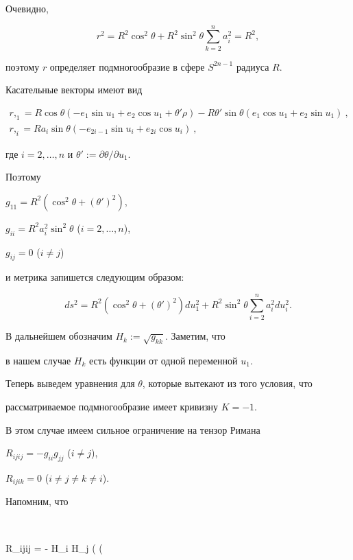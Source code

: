 Очевидно, 


$$


r^2 = R^2 \cos^2 \theta + R^2 \sin^2\theta \sum\limits_{k=2}^n a_i^2 = R^2,


$$


поэтому $r$ определяет подмногообразие в сфере $S^{2n-1}$ радиуса $R$.


Касательные векторы имеют вид


\begin{gather*}


r,_1 = R \cos\theta (- e_1 \sin u_1 + e_2 \cos u_1 + \theta'\rho) - R \theta' 


\sin\theta (e_1 \cos u_1 + e_2 \sin u_1)\ , \\


r,_i = R a_i \sin\theta (-e_{2i-1} \sin u_i + e_{2i} \cos u_i) \ ,


\end{gather*}


где $i=2,\dotsc,n$ и $\theta':= \partial \theta/\partial u_1$. 


Поэтому


$g_{11} = R^2 ( \cos^2 \theta + (\theta')^2 )$,


$g_{ii} = R^2 a_i ^2 \sin^2 \theta$ ($i=2,\dotsc,n$),


$g_{ij} = 0$ ($i\neq j$)


и метрика запишется следующим образом:


$$


ds^2 = R^2 (\cos^2\theta + (\theta')^2) du_1^2 + R^2 \sin^2\theta \sum_{i=2}^n


a_i^2 du_i^2.


$$


В дальнейшем обозначим $H_k := \sqrt{g_{kk}}$. Заметим, что


в нашем случае $H_k$ есть функции от одной переменной $u_1$.


Теперь выведем уравнения для $\theta$, которые вытекают из того условия, что


рассматриваемое подмногообразие имеет кривизну $K=-1$.


В этом случае имеем сильное ограничение на тензор Римана


$R_{ijij} = - g_{ii} g_{jj}$ ($i\neq j$),


$R_{ijik} = 0$ ($i\neq j\neq k\neq i$).


Напомним, что


$$


R_{ijij} = - H_i H_j \left(  \left( 


